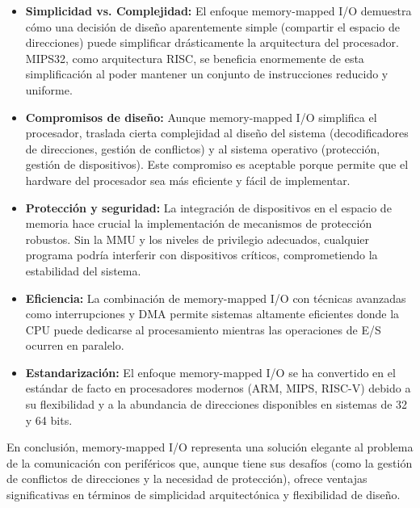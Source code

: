 \documentclass[12pt]{article}
\begin{document}
	\begin{itemize}
		\item \textbf{Simplicidad vs. Complejidad:} El enfoque memory-mapped I/O demuestra cómo una decisión de diseño aparentemente simple (compartir el espacio de direcciones) puede simplificar drásticamente la arquitectura del procesador. MIPS32, como arquitectura RISC, se beneficia enormemente de esta simplificación al poder mantener un conjunto de instrucciones reducido y uniforme.
		
		\item \textbf{Compromisos de diseño:} Aunque memory-mapped I/O simplifica el procesador, traslada cierta complejidad al diseño del sistema (decodificadores de direcciones, gestión de conflictos) y al sistema operativo (protección, gestión de dispositivos). Este compromiso es aceptable porque permite que el hardware del procesador sea más eficiente y fácil de implementar.
		
		\item \textbf{Protección y seguridad:} La integración de dispositivos en el espacio de memoria hace crucial la implementación de mecanismos de protección robustos. Sin la MMU y los niveles de privilegio adecuados, cualquier programa podría interferir con dispositivos críticos, comprometiendo la estabilidad del sistema.
		
		\item \textbf{Eficiencia:} La combinación de memory-mapped I/O con técnicas avanzadas como interrupciones y DMA permite sistemas altamente eficientes donde la CPU puede dedicarse al procesamiento mientras las operaciones de E/S ocurren en paralelo.
		
		\item \textbf{Estandarización:} El enfoque memory-mapped I/O se ha convertido en el estándar de facto en procesadores modernos (ARM, MIPS, RISC-V) debido a su flexibilidad y a la abundancia de direcciones disponibles en sistemas de 32 y 64 bits.
	\end{itemize}
	
	En conclusión, memory-mapped I/O representa una solución elegante al problema de la comunicación con periféricos que, aunque tiene sus desafíos (como la gestión de conflictos de direcciones y la necesidad de protección), ofrece ventajas significativas en términos de simplicidad arquitectónica y flexibilidad de diseño.
	
\end{document}
